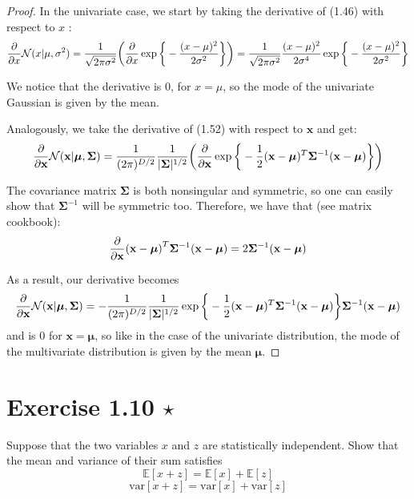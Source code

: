 \begin{proof}
    In the univariate case, we start by taking the derivative of (1.46) with
    respect to $x$ :
    \[
        \pdv{x} \mathcal{N} (x | \mu, \sigma^2)
        = \frac{1}{\sqrt{2\pi \sigma^2}} \bigg(\pdv{x} \exp \bigg\{-\frac{(x - \mu)^2}{2\sigma^2}\bigg\}\bigg)
        = \frac{1}{\sqrt{2\pi \sigma^2}} \frac{(x - \mu)^2}{2\sigma^4} \exp \bigg\{-\frac{(x - \mu)^2}{2\sigma^2}\bigg\}
    \] 

    We notice that the derivative is 0, for $x = \mu$, so the mode of the univariate Gaussian is 
    given by the mean. 

    \vspace{1em}

    Analogously, we take the derivative of (1.52) with respect to $\mathbf{x}$ and get:
    \[
        \pdv{\mathbf{x}} \mathcal{N} (\mathbf{x} | \bm{\mu}, \mathbf{\Sigma})
        = \frac{1}{(2\pi)^{D/2}} \frac{1}{|\mathbf{\Sigma}|^{1/2}}
        \bigg(\pdv{\mathbf{x}} \exp \bigg\{-\frac{1}{2} 
            (\mathbf{x} - \bm{\mu})^T \mathbf{\Sigma}^{-1} (\mathbf{x} - \bm{\mu})\bigg\}\bigg)
    \] 

    The covariance matrix $\mathbf{\Sigma}$ is both nonsingular and symmetric, so one
    can easily show that $\mathbf{\Sigma}^{-1}$ 
    will be symmetric too. Therefore, we have that (see matrix cookbook):
    \[
        \pdv{\mathbf{x}} (\mathbf{x} - \bm{\mu})^T \mathbf{\Sigma}^{-1}(\mathbf{x} - \bm{\mu})
        = 2\mathbf{\Sigma}^{-1}(\mathbf{x} - \bm{\mu})
    \] 

    As a result, our derivative becomes
    \[
        \pdv{\mathbf{x}} \mathcal{N} (\mathbf{x} | \bm{\mu}, \mathbf{\Sigma})
        = -\frac{1}{(2\pi)^{D/2}} \frac{1}{|\mathbf{\Sigma}|^{1/2}}
        \exp \bigg\{-\frac{1}{2} 
            (\mathbf{x} - \bm{\mu})^T \mathbf{\Sigma}^{-1} (\mathbf{x} - \bm{\mu})\bigg\}
            \mathbf{\Sigma}^{-1}(\mathbf{x} - \bm{\mu})
    \]
    and is 0 for $\mathbf{x} = \bm{\mu}$, so like in the case of the univariate distribution,
    the mode of the multivariate distribution is given by the mean $\bm{\mu}$.
\end{proof}

\section*{Exercise 1.10 $\star$}
Suppose that the two variables $x$ and $z$ are statistically independent. Show that
the mean and variance of their sum satisfies
\begin{equation*}
    \mathbb{E}[x + z] = \mathbb{E}[x] + \mathbb{E}[z]
    \tag{1.128}\label{eq:1.128}
\end{equation*}
\vspace{-1em}
\begin{equation*}
    \text{var}[x + z] = \text{var}[x] + \text{var}[z]
    \tag{1.129}\label{eq:1.129}
\end{equation*}

